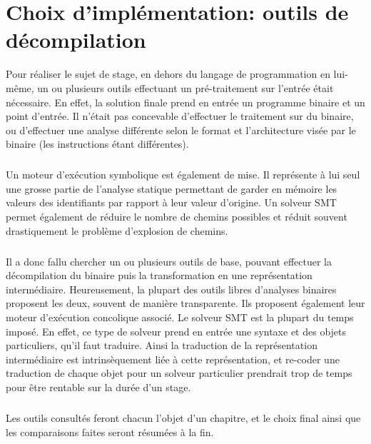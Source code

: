 \section{Choix d'implémentation: outils de décompilation}
Pour réaliser le sujet de stage, en dehors du langage de programmation en lui-même, un ou plusieurs outils effectuant
un pré-traitement sur l'entrée était nécessaire. En effet, la solution finale prend en entrée un programme binaire et un point
d'entrée. Il n'était pas concevable d'effectuer le traitement sur du binaire, ou d'effectuer une analyse différente selon le format
et l'architecture visée par le binaire (les instructions étant différentes).
\subparagraph{}
Un moteur d'exécution symbolique est également de mise. Il représente à lui seul une grosse partie de l'analyse statique permettant de
garder en mémoire les valeurs des identifiants par rapport à leur valeur d'origine. Un solveur SMT permet également de réduire le nombre
de chemins possibles et réduit souvent drastiquement le problème d'explosion de chemins.
\subparagraph{}
Il a donc fallu chercher un ou plusieurs outils de base, pouvant effectuer la décompilation du binaire puis la transformation en une
représentation intermédiaire. Heureusement, la plupart des outils libres d'analyses binaires proposent les deux, souvent de manière transparente.
Ils proposent également leur moteur d'exécution concolique associé. Le solveur SMT est la plupart du temps imposé. En effet, ce type de solveur prend
en entrée une syntaxe et des objets particuliers, qu'il faut traduire. Ainsi la traduction de la représentation intermédiaire est intrinsèquement liée à cette
représentation, et re-coder une traduction de chaque objet pour un solveur particulier prendrait trop de temps pour être rentable sur la durée d'un stage.
\subparagraph{}
Les outils consultés feront chacun l'objet d'un chapitre, et le choix final ainsi que les comparaisons faites seront résumées à la fin.

